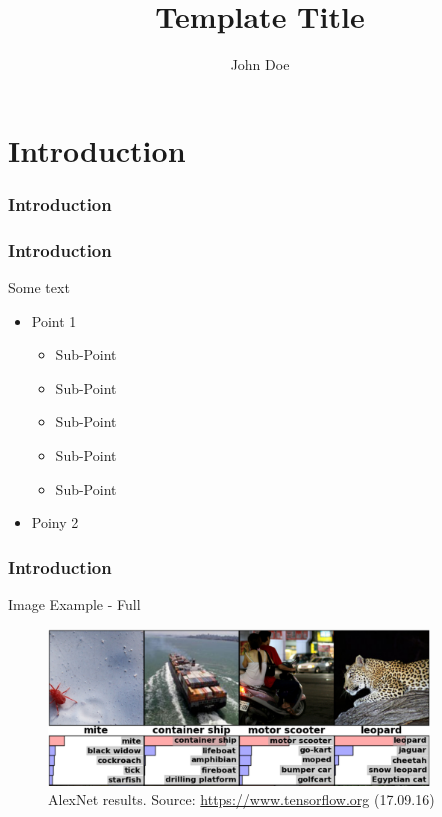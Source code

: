 \documentclass{beamer}
\title{Template Title}
\author{John Doe}
\institute[Some University]{Some University}
\begin{document}

\begin{frame}
  \maketitle
\end{frame}


\begin{frame}
	\tableofcontents
\end{frame}

\section{Introduction}
\begin{frame}
    \frametitle{Introduction}
\end{frame}

\begin{frame}
\frametitle{Introduction}
  Some text
      \begin{itemize}
        \item Point 1
        \begin{itemize}
          \item Sub-Point
          \item Sub-Point
          \item Sub-Point
          \item Sub-Point
          \item Sub-Point
        \end{itemize}
        \item Poiny 2
      \end{itemize}
\end{frame}

\begin{frame}
\frametitle{Introduction}
    Image Example - Full
    \begin{figure}[ht]
      \centering
        \includegraphics[width=0.9\textwidth]{img/alex.png}
      \caption{AlexNet results. \tiny{Source: \url{https://www.tensorflow.org} (17.09.16)} }
    \end{figure}
\end{frame}
\end{document}
